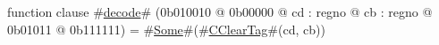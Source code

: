 function clause #\hyperref[zdecode]{decode}# (0b010010 @ 0b00000 @ cd : regno @ cb : regno @    0b01011 @ 0b111111) = #\hyperref[zSome]{Some}#(#\hyperref[zCClearTag]{CClearTag}#(cd, cb))
